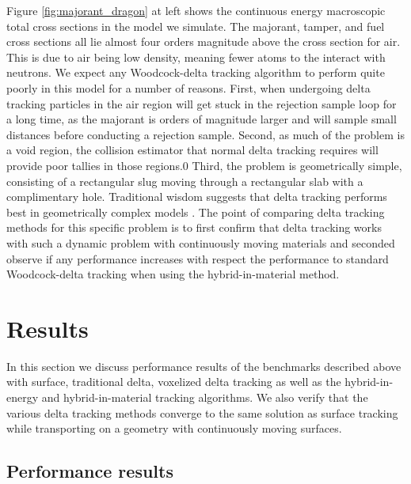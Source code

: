 Figure \ref{fig:majorant_dragon} at left shows the continuous energy macroscopic total cross sections in the model we simulate.
The majorant, tamper, and fuel cross sections all lie almost four orders magnitude above the cross section for air.
This is due to air being low density, meaning fewer atoms to the interact with neutrons.
We expect any Woodcock-delta tracking algorithm to perform quite poorly in this model for a number of reasons.
First, when undergoing delta tracking particles in the air region will get stuck in the rejection sample loop for a long time, as the majorant is orders of magnitude larger and will sample small distances before conducting a rejection sample.
Second, as much of the problem is a void region, the collision estimator that normal delta tracking requires will provide poor tallies in those regions.0
Third, the problem is geometrically simple, consisting of a rectangular slug moving through a rectangular slab with a complimentary hole.
Traditional wisdom suggests that delta tracking performs best in geometrically complex models \cite{woodcock_techniques_1965}.
The point of comparing delta tracking methods for this specific problem is to first confirm that delta tracking works with such a dynamic problem with continuously moving materials and seconded observe if any performance increases with respect the performance to standard Woodcock-delta tracking when using the hybrid-in-material method.

\section{Results}



In this section we discuss performance results of the benchmarks described above with surface, traditional delta, voxelized delta tracking as well as the hybrid-in-energy and hybrid-in-material tracking algorithms.
We also verify that the various delta tracking methods converge to the same solution as surface tracking while transporting on a geometry with continuously moving surfaces.

\subsection{Performance results}

